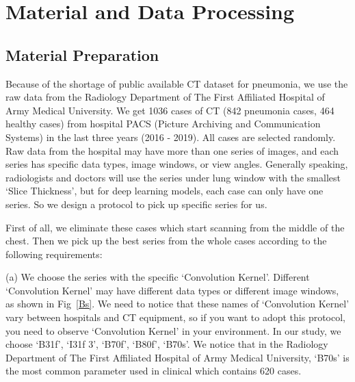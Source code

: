 \documentclass[journal]{IEEEtran}
\begin{document}
\section{Material and Data Processing}
\label{datasetprocessing}
\subsection{Material Preparation}
\label{ctimagedata}
Because of the shortage of public available CT dataset for pneumonia, we use the raw data from the Radiology Department of The First Affiliated Hospital of Army Medical University. We get 1036 cases of CT (842 pneumonia cases, 464 healthy cases) from hospital PACS (Picture Archiving and Communication Systems) in the last three years (2016 - 2019). All cases are selected randomly.
Raw data from the hospital may have more than one series of images, and each series has specific data types, image windows, or view angles. 
Generally speaking, radiologists and doctors will use the series under lung window with the smallest `Slice Thickness', but for deep learning models, each case can only have one series. So we design a protocol to pick up specific series for us.

First of all, we eliminate these cases which start scanning from the middle of the chest. Then we pick up the best series from the whole cases according to the following requirements:

(a) We choose the series with the specific `Convolution Kernel'. Different `Convolution Kernel' may have different data types or different image windows, as shown in Fig~\ref{Bs}. We need to notice that these names of `Convolution Kernel' vary between hospitals and CT equipment, so if you want to adopt this protocol, you need to observe `Convolution Kernel' in your environment. In our study, we choose `B31f', `I31f 3', `B70f', `B80f', `B70s'. We notice that in the Radiology Department of The First Affiliated Hospital of Army Medical University, `B70s' is the most common parameter used in clinical which contains 620 cases.
\end{document}
